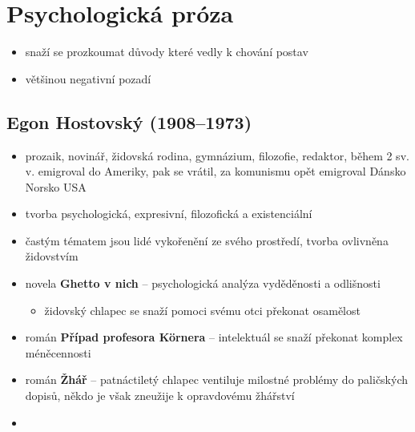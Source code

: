 \section{Psychologická próza}
\begin{itemize}
\item snaží se prozkoumat důvody které vedly k chování postav
\item většinou negativní pozadí
\end{itemize}

\subsection{Egon Hostovský (1908--1973)}
\begin{itemize}
\item prozaik, novinář, židovská rodina, gymnázium, filozofie, redaktor, během 2 sv. v. emigroval do Ameriky, pak se vrátil, za komunismu opět emigroval \ra Dánsko \ra Norsko \ra USA
\item tvorba psychologická, expresivní, filozofická a existenciální
\item častým tématem jsou lidé vykořenění ze svého prostředí, tvorba ovlivněna židovstvím
\item novela \textbf{Ghetto v nich} -- psychologická analýza vyděděnosti a odlišnosti
	\begin{itemize}
	\item židovský chlapec se snaží pomoci svému otci překonat osamělost
	\end{itemize}
\item román \textbf{Případ profesora Körnera} -- intelektuál se snaží překonat komplex méněcennosti
\item román \textbf{Žhář} -- patnáctiletý chlapec ventiluje milostné problémy do paličských dopisů, někdo je však zneužije k opravdovému žhářství
\item 
\end{itemize}

